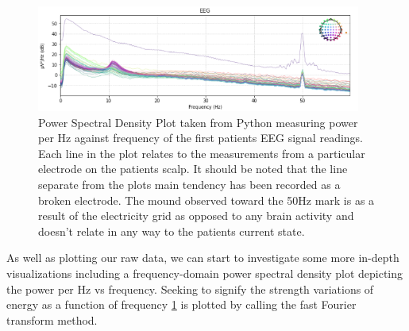 \documentclass[12pt]{article}
\begin{document}
\begin{figure}[tb]
\centering
\includegraphics[width=0.95\textwidth]{PSDPlot.png}
\caption{\label{fig:PSDPlot}Power Spectral Density Plot taken from Python measuring power per Hz against frequency of the first patients EEG signal readings. Each line in the plot relates to the measurements from a particular electrode on the patients scalp. It should be noted that the line separate from the plots main tendency has been recorded as a broken electrode. The mound observed toward the 50Hz mark is as a result of the electricity grid as opposed to any brain activity and doesn't relate in any way to the patients current state.  }
\end{figure} 

As well as plotting our raw data, we can start to investigate some more in-depth visualizations including a frequency-domain power spectral density plot depicting the power per Hz vs frequency. Seeking to signify the strength variations of energy as a function of frequency \ref{fig:PSDPlot} is plotted by calling the fast Fourier transform method.
\end{document}
